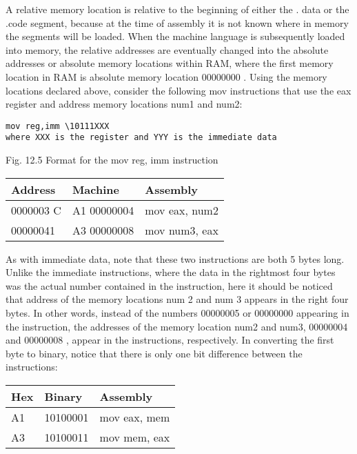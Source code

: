 \documentclass[10pt]{article}
\begin{document}
A relative memory location is relative to the beginning of either the . data or the .code segment, because at the time of assembly it is not known where in memory the segments will be loaded. When the machine language is subsequently loaded into memory, the relative addresses are eventually changed into the absolute addresses or absolute memory locations within RAM, where the first memory location in RAM is absolute memory location 00000000 . Using the memory locations declared above, consider the following mov instructions that use the eax register and address memory locations num1 and num2:

\begin{verbatim}
mov reg,imm \10111XXX 
where XXX is the register and YYY is the immediate data
\end{verbatim}

Fig. 12.5 Format for the mov reg, imm instruction

\begin{center}
\begin{tabular}{|l|l|l|}
\hline
Address & Machine & Assembly \\
\hline
0000003 C & A1 00000004 & mov eax, num2 \\
\hline
00000041 & A3 00000008 & mov num3, eax \\
\hline
\end{tabular}
\end{center}

As with immediate data, note that these two instructions are both 5 bytes long. Unlike the immediate instructions, where the data in the rightmost four bytes was the actual number contained in the instruction, here it should be noticed that address of the memory locations num 2 and num 3 appears in the right four bytes. In other words, instead of the numbers 00000005 or 00000000 appearing in the instruction, the addresses of the memory location num2 and num3, 00000004 and 00000008 , appear in the instructions, respectively. In converting the first byte to binary, notice that there is only one bit difference between the instructions:

\begin{center}
\begin{tabular}{|l|l|l|}
\hline
Hex & Binary & Assembly \\
\hline
A1 & 10100001 & mov eax, mem \\
\hline
A3 & 10100011 & mov mem, eax \\
\hline
\end{tabular}
\end{center}
\end{document}
